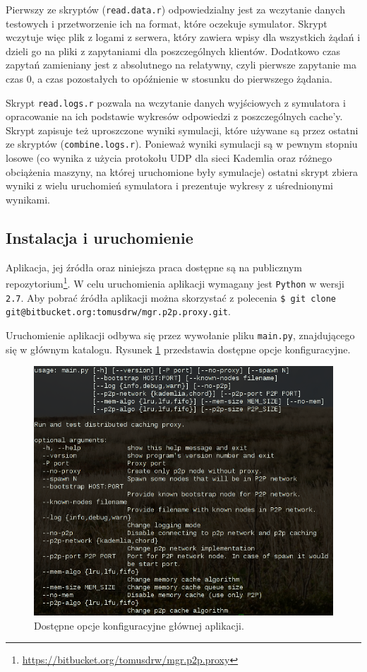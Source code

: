 \documentclass[a4paper,11pt]{scrartcl}
\newcommand{\f}{\texttt}
\newcommand{\keszy}{cache'y}
\begin{document}
Pierwszy ze skryptów (\f{read.data.r}) odpowiedzialny jest za wczytanie danych testowych i przetworzenie ich na format, które oczekuje symulator. Skrypt wczytuje więc plik z logami z serwera, który zawiera wpisy dla wszystkich żądań i dzieli go na pliki z zapytaniami dla poszczególnych klientów. Dodatkowo czas zapytań zamieniany jest z absolutnego na relatywny, czyli pierwsze zapytanie ma czas $0$, a czas pozostałych to opóźnienie w stosunku do pierwszego żądania.

Skrypt \f{read.logs.r} pozwala na wczytanie danych wyjściowych z symulatora i opracowanie na ich podstawie wykresów odpowiedzi z poszczególnych \keszy. Skrypt zapisuje też uproszczone wyniki symulacji, które używane są przez ostatni ze skryptów (\f{combine.logs.r}). Ponieważ wyniki symulacji są w pewnym stopniu losowe (co wynika z użycia protokołu UDP dla sieci Kademlia oraz różnego obciążenia maszyny, na której uruchomione były symulacje) ostatni skrypt zbiera wyniki z wielu uruchomień symulatora i prezentuje wykresy z uśrednionymi wynikami.

\subsection{Instalacja i uruchomienie}
\label{sect_impl_install}
Aplikacja, jej źródła oraz niniejsza praca dostępne są na publicznym repozytorium\footnote{\url{https://bitbucket.org/tomusdrw/mgr.p2p.proxy}}. W celu uruchomienia aplikacji wymagany jest \f{Python} w wersji \f{2.7}. Aby pobrać źródła aplikacji można skorzystać z polecenia \f{\$ git clone git@bitbucket.org:tomusdrw/mgr.p2p.proxy.git}.

Uruchomienie aplikacji odbywa się przez wywołanie pliku \f{main.py}, znajdującego się w głównym katalogu. Rysunek \ref{fig_main_help} przedstawia dostępne opcje konfiguracyjne.

\begin{figure}[h]
\centering
\includegraphics[width=0.8\linewidth]{img/options.png}
\caption{Dostępne opcje konfiguracyjne głównej aplikacji.}
\label{fig_main_help}
\end{figure}
\end{document}
